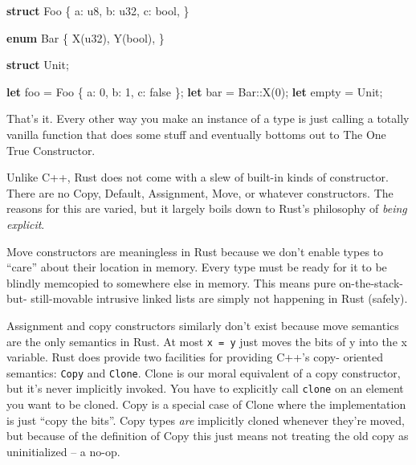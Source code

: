 \documentclass[a4paper,]{book}
\newenvironment{Shaded}{\begin{snugshade}}{\end{snugshade}}
\newcommand{\KeywordTok}[1]{\textcolor[rgb]{0.13,0.29,0.53}{\textbf{{#1}}}}
\newcommand{\DataTypeTok}[1]{\textcolor[rgb]{0.13,0.29,0.53}{{#1}}}
\newcommand{\DecValTok}[1]{\textcolor[rgb]{0.00,0.00,0.81}{{#1}}}
\newcommand{\ConstantTok}[1]{\textcolor[rgb]{0.00,0.00,0.00}{{#1}}}
\newcommand{\NormalTok}[1]{{#1}}
\begin{document}
\begin{Shaded}
\begin{Highlighting}[]
\KeywordTok{struct} \NormalTok{Foo \{}
    \NormalTok{a: }\DataTypeTok{u8}\NormalTok{,}
    \NormalTok{b: }\DataTypeTok{u32}\NormalTok{,}
    \NormalTok{c: }\DataTypeTok{bool}\NormalTok{,}
\NormalTok{\}}

\KeywordTok{enum} \NormalTok{Bar \{}
    \NormalTok{X(}\DataTypeTok{u32}\NormalTok{),}
    \NormalTok{Y(}\DataTypeTok{bool}\NormalTok{),}
\NormalTok{\}}

\KeywordTok{struct} \NormalTok{Unit;}

\KeywordTok{let} \NormalTok{foo = Foo \{ a: }\DecValTok{0}\NormalTok{, b: }\DecValTok{1}\NormalTok{, c: }\ConstantTok{false} \NormalTok{\};}
\KeywordTok{let} \NormalTok{bar = Bar::X(}\DecValTok{0}\NormalTok{);}
\KeywordTok{let} \NormalTok{empty = Unit;}
\end{Highlighting}
\end{Shaded}

That's it. Every other way you make an instance of a type is just
calling a totally vanilla function that does some stuff and eventually
bottoms out to The One True Constructor.

Unlike C++, Rust does not come with a slew of built-in kinds of
constructor. There are no Copy, Default, Assignment, Move, or whatever
constructors. The reasons for this are varied, but it largely boils down
to Rust's philosophy of \emph{being explicit}.

Move constructors are meaningless in Rust because we don't enable types
to ``care'' about their location in memory. Every type must be ready for
it to be blindly memcopied to somewhere else in memory. This means pure
on-the-stack-but- still-movable intrusive linked lists are simply not
happening in Rust (safely).

Assignment and copy constructors similarly don't exist because move
semantics are the only semantics in Rust. At most \texttt{x\ =\ y} just
moves the bits of y into the x variable. Rust does provide two
facilities for providing C++'s copy- oriented semantics: \texttt{Copy}
and \texttt{Clone}. Clone is our moral equivalent of a copy constructor,
but it's never implicitly invoked. You have to explicitly call
\texttt{clone} on an element you want to be cloned. Copy is a special
case of Clone where the implementation is just ``copy the bits''. Copy
types \emph{are} implicitly cloned whenever they're moved, but because
of the definition of Copy this just means not treating the old copy as
uninitialized -- a no-op.
\end{document}

